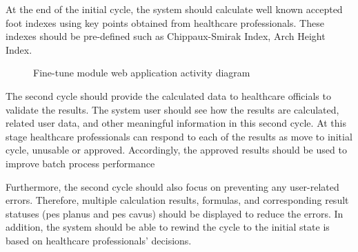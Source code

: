 At the end of the initial cycle, the system should calculate well known accepted foot indexes using key points obtained from healthcare professionals. These indexes should be pre-defined such as Chippaux-Smirak Index, Arch Height Index.

\begin{figure}[htbp]
\centering
{}
\caption{Fine-tune module web application activity diagram}
\label{fig:FineTuneModuleWebApplicationSequenceDiagram}
\end{figure}

The second cycle should provide the calculated data to healthcare officials to validate the results. The system user should see how the results are calculated, related user data, and other meaningful information in this second cycle. At this stage healthcare professionals can respond to each of the results as move to initial cycle, unusable or approved. Accordingly, the approved results should be used to improve batch process performance

Furthermore, the second cycle should also focus on preventing any user-related errors. Therefore, multiple calculation results, formulas, and corresponding result statuses (pes planus and pes cavus) should be displayed to reduce the errors. In addition, the system should be able to rewind the cycle to the initial state is based on healthcare professionals' decisions.

